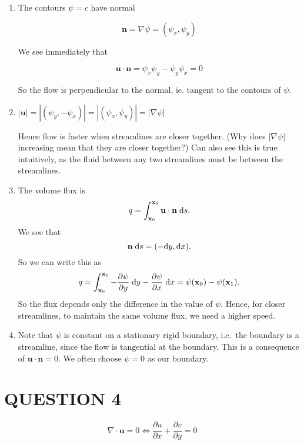 \documentclass[a4paper]{article}
\begin{document}
\begin{enumerate}
	\item The contours $ \psi = c $ have normal
	
	\[ \mathbf{n} = \nabla  \psi = (\psi_{x},\psi_{y}) \]
	
	We see immediately that
	
	\[ \mathbf{u} \cdot \mathbf{n} = \psi_{x} \psi_{y} - \psi_{y} \psi_{x} = 0 \]
	
	So the flow is perpendicular to the normal, ie. tangent to the contours of $ \psi $. 
	
	\item $ \left| \mathbf{u} \right| = | (\psi_{y},-\psi_{x}) | =  | (\psi_{x},\psi_{y}) | = | \nabla \psi | $
	
	Hence flow is faster when streamlines are closer together. (Why does $ | \nabla  \psi | $ increasing mean that they are closer together?) Can also see this is true intuitively, as the fluid between any two streamlines must be between the streamlines. 
	
	
	\item The volume flux is
	\[
	q = \int_{\mathbf{x}_0}^{\mathbf{x}_1} \mathbf{u}\cdot \mathbf{n}\;\mathrm{d} s.
	\]
	We see that
	\[
	\mathbf{n}\;\mathrm{d} s = (-\mathrm{d} y, \mathrm{d} x).
	\]
	So we can write this as
	\[
	q = \int_{\mathbf{x}_0}^{\mathbf{x}_1} -\frac{\partial \psi}{\partial y}\;\mathrm{d} y - \frac{\partial \psi}{\partial x}\;\mathrm{d} x = \psi(\mathbf{x}_0) - \psi(\mathbf{x}_1).
	\]
	So the flux depends only the difference in the value of $\psi$. Hence, for closer streamlines, to maintain the same volume flux, we need a higher speed.
	
	\item Note that $\psi$ is constant on a stationary rigid boundary, i.e.\ the boundary is a streamline, since the flow is tangential at the boundary. This is a consequence of $\mathbf{u}\cdot \mathbf{n} = 0$. We often choose $\psi = 0$ as our boundary.
	
	
\end{enumerate}









\section{QUESTION 4}

\[ \nabla \cdot \mathbf{u} = 0 \iff \frac{\partial u }{\partial x} + \frac{\partial v}{\partial y} = 0  \]
\end{document}
